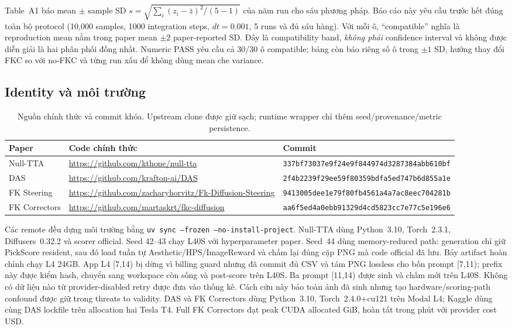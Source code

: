 \documentclass[11pt,a4paper]{article}
\newcommand{\code}[1]{\texttt{#1}}
\begin{document}
Table~A1 báo mean $\pm$ sample SD $s=\sqrt{\sum_i(z_i-\bar z)^2/(5-1)}$ của năm run cho sáu phương pháp. Báo cáo này yêu cầu trước hết đúng toàn bộ protocol (10,000 samples, 1000 integration steps, $dt=0.001$, 5 runs và đủ sáu hàng). Với mỗi ô, ``compatible'' nghĩa là reproduction mean nằm trong paper mean $\pm2$ paper-reported SD. Đây là compatibility band, \emph{không phải} confidence interval và không được diễn giải là hai phân phối đồng nhất. Numeric PASS yêu cầu cả 30/30 ô compatible; bảng còn báo riêng số ô trong $\pm1$ SD, hướng thay đổi FKC so với no-FKC và từng run xấu để không dùng mean che variance.

\subsection{Identity và môi trường}

\begin{table}[H]
\centering
\small
\caption{Nguồn chính thức và commit khóa. Upstream clone được giữ sạch; runtime wrapper chỉ thêm seed/provenance/metric persistence.}
\begin{tabularx}{\textwidth}{@{}p{2.4cm}Yp{4.3cm}@{}}
\toprule
Paper & Code chính thức & Commit \\
\midrule
Null-TTA \citep{Kim2026NullTTA} & \url{https://github.com/kthone/null-tta} \citep{NullTTACode} & \nolinkurl{337bf73037e9f24e9f844974d3287384abb610bf} \\
DAS \citep{Kim2025DAS} & \url{https://github.com/krafton-ai/DAS} \citep{DASCode} & \nolinkurl{2f4b2239f29ee59f80359bdfa5ed747b6d855a1e} \\
FK Steering \citep{Singhal2025FKSteering} & \url{https://github.com/zacharyhorvitz/Fk-Diffusion-Steering} \citep{FKSteeringCode} & \nolinkurl{9413005dee1e79f80fb4561a4a7ac8eec704281b} \\
FK Correctors \citep{Skreta2025FKC} & \url{https://github.com/martaskrt/fkc-diffusion} \citep{FKCCode} & \nolinkurl{aa6f5ed4a0ebb91329d4cd5823cc7e77c5e196e6} \\
\bottomrule
\end{tabularx}
\end{table}

Các remote đều dựng môi trường bằng \code{uv sync --frozen --no-install-project}. Null-TTA dùng Python~3.10, Torch~2.3.1, Diffusers~0.32.2 và scorer official. Seed 42--43 chạy L40S với hyperparameter paper. Seed~44 dùng memory-reduced path: generation chỉ giữ PickScore resident, sau đó load tuần tự Aesthetic/HPS/ImageReward và chấm lại đúng cặp PNG mà code official đã lưu. Bảy artifact hoàn chỉnh chạy L4 24GB. App L4 [7,14) bị dừng vì billing guard nhưng đã commit đủ CSV và tám PNG lossless cho bốn prompt [7,11); prefix này được kiểm hash, chuyển sang workspace còn sống và post-score trên L40S. Ba prompt [11,14) được sinh và chấm mới trên L40S. Không có dữ liệu nào từ provider-disabled retry được đưa vào thống kê. Cách cứu này bảo toàn ảnh đã sinh nhưng tạo hardware/scoring-path confound được giữ trong threats to validity. DAS và FK Correctors dùng Python~3.10, Torch~2.4.0+cu121 trên Modal L4; Kaggle dùng cùng DAS lockfile trên allocation hai Tesla T4. Full FK Correctors đạt peak CUDA allocated \FKCMaxVRAM{} GiB, hoàn tất trong \FKCElapsedMinutes{} phút với provider cost \FKCCost{} USD.
\end{document}
